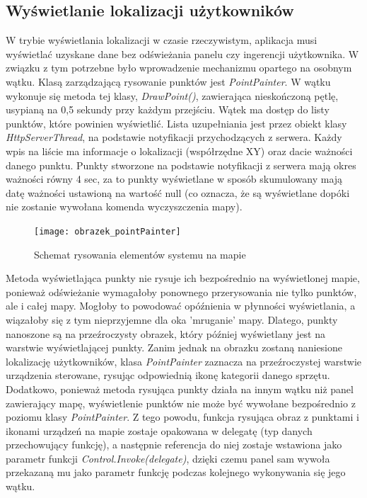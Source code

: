 \subsection{Wyświetlanie lokalizacji użytkowników} W trybie wyświetlania lokalizacji w czasie rzeczywistym, aplikacja musi wyświetlać uzyskane dane bez odświeżania panelu czy ingerencji użytkownika. W związku z tym potrzebne było wprowadzenie mechanizmu opartego na osobnym wątku. Klasą zarządzającą rysowanie punktów jest \textit{PointPainter}. W wątku wykonuje się metoda tej klasy, \textit{DrawPoint()}, zawierająca nieskończoną pętlę, usypianą na 0,5 sekundy przy każdym przejściu. Wątek ma dostęp do listy punktów, które powinien wyświetlić. Lista uzupełniania jest przez obiekt klasy \textit{HttpServerThread}, na podstawie notyfikacji przychodzących z serwera. Każdy wpis na liście ma informacje o lokalizacji (współrzędne XY) oraz dacie ważności danego punktu. Punkty stworzone na podstawie notyfikacji z serwera mają okres ważności równy 4 sec, za to punkty wyświetlane w sposób skumulowany mają datę ważności ustawioną na wartość null (co oznacza, że są wyświetlane dopóki nie zostanie wywołana komenda wyczyszczenia mapy).
\begin{figure}[H]			
	\centering
	\caption{Schemat rysowania elementów systemu na mapie}
	\texttt{[image: obrazek\_pointPainter]}
\end{figure}
Metoda wyświetlająca punkty nie rysuje ich bezpośrednio na wyświetlonej mapie, ponieważ odświeżanie wymagałoby ponownego przerysowania nie tylko punktów, ale i całej mapy. Mogłoby to powodować opóźnienia w płynności wyświetlania, a wiązałoby się z tym nieprzyjemne dla oka 'mruganie' mapy. Dlatego, punkty nanoszone są na przeźroczysty obrazek, który później wyświetlany jest na warstwie wyświetlającej punkty. Zanim jednak na obrazku zostaną naniesione lokalizację użytkowników, klasa \textit{PointPainter} zaznacza na przeźroczystej warstwie urządzenia sterowane, rysując odpowiednią ikonę kategorii danego sprzętu. Dodatkowo, ponieważ metoda rysująca punkty działa na innym wątku niż panel zawierający mapę, wyświetlenie punktów nie może być wywołane bezpośrednio z poziomu klasy \textit{PointPainter}. Z tego powodu, funkcja rysująca obraz z punktami i ikonami urządzeń na mapie zostaje opakowana w delegatę (typ danych przechowujący funkcję), a następnie referencja do niej zostaje wstawiona jako parametr funkcji \textit{Control.Invoke(delegate)}, dzięki czemu panel sam wywoła przekazaną mu jako parametr funkcję podczas kolejnego wykonywania się jego wątku.
